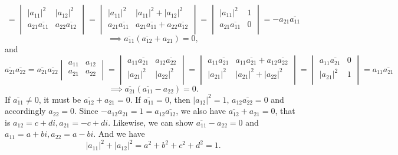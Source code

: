 \documentclass[12pt,letterpaper,boxed]{hmcpset}
\begin{document}
\begin{solution}
\[=
\begin{vmatrix}
|a_{11}|^2& |a_{12}|^2\\
a_{21}\overline{a_{11}}& a_{22}\overline{a_{12}}\\
\end{vmatrix}
=
\begin{vmatrix}
|a_{11}|^2&|a_{11}|^2+ |a_{12}|^2\\
a_{21}\overline{a_{11}}&a_{21}\overline{a_{11}}+ a_{22}\overline{a_{12}}\\
\end{vmatrix}
=
\begin{vmatrix}
|a_{11}|^2&1\\
a_{21}\overline{a_{11}}&0\\
\end{vmatrix}
=-a_{21}\overline{a_{11}}
\]
\[
\implies\overline{a_{11}}(\overline{a_{12}}+a_{21})=0,
\]
and
\[
\overline{a_{21}}\overline{a_{22}}=\overline{a_{21}}\overline{a_{22}}
\begin{vmatrix}
a_{11}& a_{12}\\
a_{21}& a_{22}\\
\end{vmatrix}
=
\begin{vmatrix}
a_{11}\overline{a_{21}}& a_{12}\overline{a_{22}}\\
|a_{21}|^2& |a_{22}|^2\\
\end{vmatrix}
=
\begin{vmatrix}
a_{11}\overline{a_{21}}&a_{11}\overline{a_{21}}+ a_{12}\overline{a_{22}}\\
|a_{21}|^2&|a_{21}|^2+ |a_{22}|^2\\
\end{vmatrix}
=
\begin{vmatrix}
a_{11}\overline{a_{21}}&0\\
|a_{21}|^2&1\\
\end{vmatrix}
=a_{11}\overline{a_{21}}
\]
\[
\implies\overline{a_{21}}(\overline{a_{11}}-a_{22})=0.
\]
If $\overline{a_{11}}\ne0$, it must be $\overline{a_{12}}+a_{21}=0$. If $\overline{a_{11}}=0$, then $|a_{12}|^2=1$, $a_{12}\overline{a_{22}}=0$ and accordingly $a_{22}=0$. Since $-a_{12}a_{21}=1=a_{12}\overline{a_{12}}$, we also have $\overline{a_{12}}+a_{21}=0$, that is $a_{12}=c+di, a_{21}=-c+di$. Likewise, we can show $\overline{a_{11}}-a_{22}=0$ and $a_{11}=a+bi, a_{22}=a-bi$. And we have
\[
|a_{11}|^2+|a_{12}|^2=a^2 + b^2 + c^2 + d^2 = 1.
\]
\end{solution}
\end{document}
